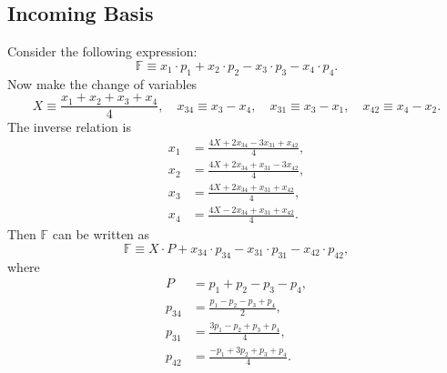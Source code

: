 \subsection{Incoming Basis}
Consider the following expression:
\begin{equation}
	\mathbb{F} \equiv x_{1} \cdot p_{1} + x_{2} \cdot p_{2} - x_{3} \cdot p_{3} - x_{4} \cdot p_{4}.
	\label{eq:F}
\end{equation}
Now make the change of variables
\begin{equation}
	X \equiv \frac{x_{1} + x_{2} + x_{3} + x_{4}}{4}, \quad x_{34} \equiv x_{3} - x_{4}, \quad x_{31} \equiv x_{3} - x_{1}, \quad x_{42} \equiv x_{4} - x_{2}.
\end{equation}
The inverse relation is
\begin{align}
	x_{1} &= \frac{4 X + 2x_{34} - 3x_{31} + x_{42}}{4}, \\
	x_{2} &= \frac{4 X + 2x_{34} + x_{31} - 3x_{42}}{4}, \\
	x_{3} &= \frac{4 X + 2x_{34} + x_{31} + x_{42}}{4}, \\
	x_{4} &= \frac{4 X - 2x_{34} + x_{31} + x_{42}}{4}.
\end{align}
Then $\mathbb{F}$ can be written as
\begin{equation}
	\mathbb{F} \equiv X \cdot P + x_{34} \cdot p_{34} - x_{31} \cdot p_{31} - x_{42} \cdot p_{42},
\end{equation}
where
\begin{align}
	P &= p_{1} + p_{2} - p_{3} - p_{4}, \\
	p_{34} &= \frac{p_{1} - p_{2} - p_{3} + p_{4}}{2}, \\
	p_{31} &= \frac{3p_{1} - p_{2} + p_{3} + p_{4}}{4}, \\
	p_{42} &= \frac{-p_{1} + 3p_{2} + p_{3} + p_{4}}{4}.
\end{align}
